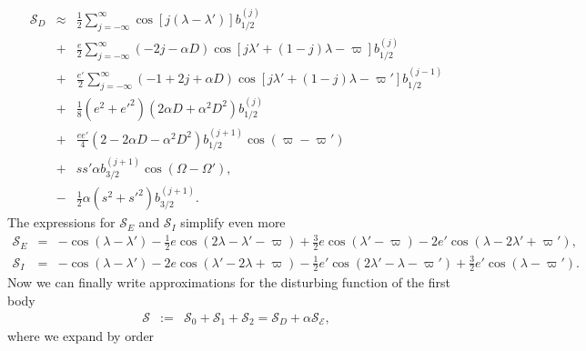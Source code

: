 \documentclass [12pt, a4paper] {article}
\begin{document}
\begin {eqnarray}
    \mathcal{S}_D
    &\approx&
    \frac{1}{2}\sum_{j=-\infty}^\infty 
    \cos[j(\lambda - \lambda')]
    b_{1/2}^{(j)}
    \\\nonumber 
    &+&
    \frac{e}{2}\sum_{j=-\infty}^\infty 
    (-2j - \alpha D)
    \cos[j\lambda' + (1 - j)\lambda - \varpi]
    b_{1/2}^{(j)}
    \\\nonumber 
    &+&
    \frac{e'}{2}\sum_{j=-\infty}^\infty 
    (-1 +2j + \alpha D)
    \cos[j\lambda' + (1 - j)\lambda - \varpi']
    b_{1/2}^{(j-1)}
    \\\nonumber
    &+&
    \frac{1}{8}(e^2 + e'^2)(2\alpha D + \alpha^2D^2)b_{1/2}^{(j)}
    \\\nonumber 
    &+&
    \frac{ee'}{4}(2 - 2\alpha D - \alpha^2D^2)b_{1/2}^{(j + 1)}\cos(\varpi - \varpi')
    \\\nonumber 
    &+&
    ss'\alpha b_{3/2}^{(j + 1)}\cos(\Omega - \Omega'),
    \\\nonumber 
    &-&
    \frac{1}{2}\alpha(s^2 + s'^2)b_{3/2}^{(j+1)}.
\end {eqnarray}
The expressions for $\mathcal{S}_E$ and $\mathcal{S}_I$ simplify even more 
\begin {eqnarray}
    \mathcal{S}_E 
    &=& 
    -
    \cos(\lambda - \lambda')
    -
    \frac{1}{2}e\cos(2\lambda - \lambda' - \varpi)
    +
    \frac{3}{2}e\cos(\lambda' - \varpi)
    -
    2e'\cos(\lambda - 2\lambda' + \varpi'),
    \\
    \mathcal{S}_I
    &=&
    -
    \cos(\lambda - \lambda')
    -
    2e\cos(\lambda' - 2\lambda + \varpi)
    -
    \frac{1}{2}e'\cos(2\lambda' - \lambda - \varpi')
    +
    \frac{3}{2}e'\cos(\lambda - \varpi').
\end {eqnarray}
Now we can finally write approximations for the disturbing function of the first body
\begin {eqnarray}
    \mathcal{S}
    &:=& 
    \mathcal{S}_0
    +
    \mathcal{S}_1
    +
    \mathcal{S}_2
    =
    \mathcal{S}_D
    +
    \alpha \mathcal{S_E},
\end {eqnarray}
where we expand by order
\end{document}
